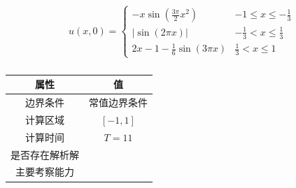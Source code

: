 \documentclass{book}
\begin{document}
\begin{example}

    \begin{equation}
        u(x, 0)=\begin{cases}
            -x \sin \left(\frac{3 \pi}{2} x^{2}\right) & -1\leqslant x \leqslant -\frac{1}{3}  \\
            |\sin (2 \pi x)|                           & -\frac{1}{3}< x \leqslant \frac{1}{3} \\
            2 x-1-\frac{1}{6} \sin (3 \pi x)           & \frac{1}{3} < x \leqslant 1
        \end{cases}
    \end{equation}

    \begin{table}[htbp]
        \centering
        \label{table:}
        \caption{}
        \begin{tabular}{cc}
            \toprule
            属性           & 值           \\
            \midrule
            边界条件       & 常值边界条件 \\
            计算区域       & $[-1, 1]$    \\
            计算时间       & $T=11$       \\
            是否存在解析解 &              \\
            主要考察能力   &              \\
            \bottomrule
        \end{tabular}
    \end{table}
\end{example}
\end{document}
